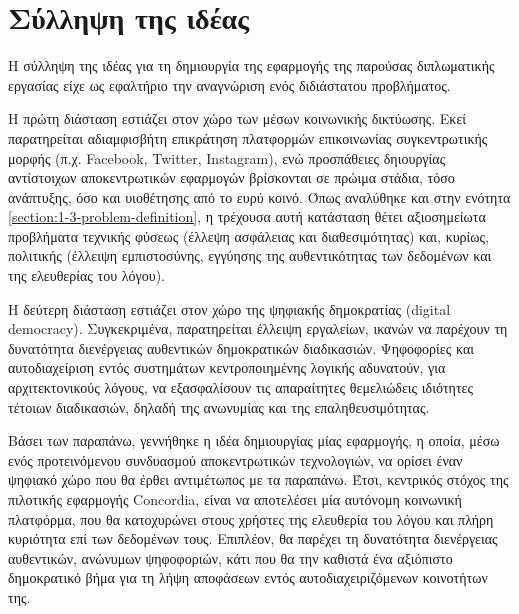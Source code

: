 \section{Σύλληψη της ιδέας} \label{section:3-1-idea-conception}

Η σύλληψη της ιδέας για τη δημιουργία της εφαρμογής της παρούσας διπλωματικής εργασίας είχε ως εφαλτήριο την αναγνώριση ενός διδιάστατου προβλήματος.

Η πρώτη διάσταση εστιάζει στον χώρο των μέσων κοινωνικής δικτύωσης. Εκεί παρατηρείται αδιαμφισβήτη επικράτηση πλατφορμών επικοινωνίας συγκεντρωτικής μορφής (π.χ. Facebook, Twitter, Instagram), ενώ προσπάθειες δηιουργίας αντίστοιχων αποκεντρωτικών εφαρμογών βρίσκονται σε πρώιμα στάδια, τόσο ανάπτυξης, όσο και υιοθέτησης από το ευρύ κοινό. Όπως αναλύθηκε και στην ενότητα \ref{section:1-3-problem-definition}, η τρέχουσα αυτή κατάσταση θέτει αξιοσημείωτα προβλήματα τεχνικής φύσεως (έλλεψη ασφάλειας και διαθεσιμότητας) και, κυρίως, πολιτικής (έλλειψη εμπιστοσύνης, εγγύησης της αυθεντικότητας των δεδομένων και της ελευθερίας του λόγου).

Η δεύτερη διάσταση εστιάζει στον χώρο της ψηφιακής δημοκρατίας (digital democracy). Συγκεκριμένα, παρατηρείται έλλειψη  εργαλείων, ικανών να παρέχουν τη δυνατότητα διενέργειας αυθεντικών δημοκρατικών διαδικασιών. Ψηφοφορίες και αυτοδιαχείριση εντός συστημάτων κεντροποιημένης λογικής αδυνατούν, για αρχιτεκτονικούς λόγους, να εξασφαλίσουν τις απαραίτητες θεμελιώδεις ιδιότητες τέτοιων διαδικασιών, δηλαδή της ανωνυμίας και της επαληθευσιμότητας.

Βάσει των παραπάνω, γεννήθηκε η ιδέα δημιουργίας μίας εφαρμογής, η οποία, μέσω ενός προτεινόμενου συνδυασμού αποκεντρωτικών τεχνολογιών, να ορίσει έναν ψηφιακό χώρο που θα έρθει αντιμέτωπος με τα παραπάνω. Έτσι, κεντρικός στόχος της πιλοτικής εφαρμογής Concordia, είναι να αποτελέσει μία αυτόνομη κοινωνική πλατφόρμα, που θα κατοχυρώνει στους χρήστες της ελευθερία του λόγου και πλήρη κυριότητα επί των δεδομένων τους. Επιπλέον, θα παρέχει τη δυνατότητα διενέργειας αυθεντικών, ανώνυμων ψηφοφοριών, κάτι που θα την καθιστά ένα αξιόπιστο δημοκρατικό βήμα για τη λήψη αποφάσεων εντός αυτοδιαχειριζόμενων κοινοτήτων της.

\newpage